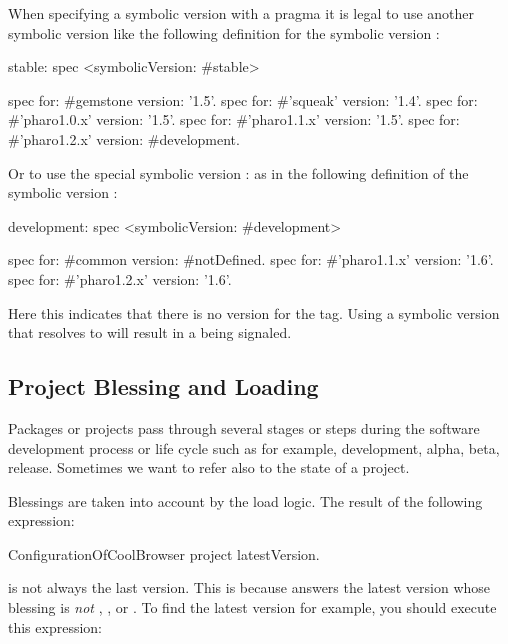 \documentclass[a4paper,10pt,twoside]{book}
\begin{document}
When specifying a symbolic version with a  pragma it is legal to use another symbolic version like the following definition for the symbolic version :

\begin{code}{}
stable: spec
       <symbolicVersion: #stable>

       spec for: #gemstone version: '1.5'.
       spec for: #'squeak' version: '1.4'.
       spec for: #'pharo1.0.x' version: '1.5'.
       spec for: #'pharo1.1.x' version: '1.5'.
       spec for: #'pharo1.2.x' version: #development.
\end{code}

Or to use the special symbolic version : as in the following definition of the symbolic version :

\begin{code}{}
development: spec
       <symbolicVersion: #development>

       spec for: #common version: #notDefined.
       spec for: #'pharo1.1.x' version: '1.6'.
       spec for: #'pharo1.2.x' version: '1.6'.
\end{code}

Here this indicates that there is no version for the  tag. 
Using a symbolic version that resolves to  will result in a  being signaled.







\subsection{Project Blessing and Loading}
Packages or projects pass through several stages or steps during the software development process or life cycle such as for example, development, alpha, beta, release. Sometimes we want to refer also to the state of a project.

Blessings are taken into account by the load logic. The result of the following expression:
\begin{code}{}
ConfigurationOfCoolBrowser project latestVersion.
\end{code}
is not always the last version.  This is because  answers the latest version whose blessing is {\em not} , , or . To find the latest  version for example, you should execute this expression:
\end{document}
